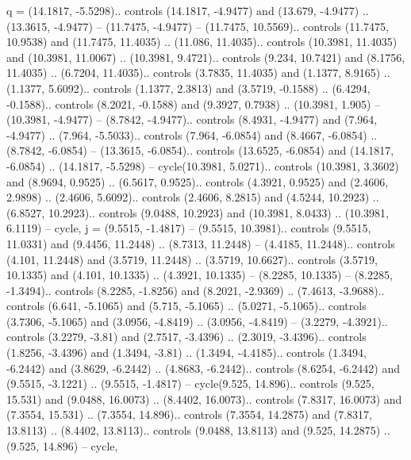 q = {(14.1817, -5.5298).. controls (14.1817, -4.9477) and (13.679, -4.9477) .. (13.3615, -4.9477) -- (11.7475, -4.9477) -- (11.7475, 10.5569).. controls (11.7475, 10.9538) and (11.7475, 11.4035) .. (11.086, 11.4035).. controls (10.3981, 11.4035) and (10.3981, 11.0067) .. (10.3981, 9.4721).. controls (9.234, 10.7421) and (8.1756, 11.4035) .. (6.7204, 11.4035).. controls (3.7835, 11.4035) and (1.1377, 8.9165) .. (1.1377, 5.6092).. controls (1.1377, 2.3813) and (3.5719, -0.1588) .. (6.4294, -0.1588).. controls (8.2021, -0.1588) and (9.3927, 0.7938) .. (10.3981, 1.905) -- (10.3981, -4.9477) -- (8.7842, -4.9477).. controls (8.4931, -4.9477) and (7.964, -4.9477) .. (7.964, -5.5033).. controls (7.964, -6.0854) and (8.4667, -6.0854) .. (8.7842, -6.0854) -- (13.3615, -6.0854).. controls (13.6525, -6.0854) and (14.1817, -6.0854) .. (14.1817, -5.5298) -- cycle(10.3981, 5.0271).. controls (10.3981, 3.3602) and (8.9694, 0.9525) .. (6.5617, 0.9525).. controls (4.3921, 0.9525) and (2.4606, 2.9898) .. (2.4606, 5.6092).. controls (2.4606, 8.2815) and (4.5244, 10.2923) .. (6.8527, 10.2923).. controls (9.0488, 10.2923) and (10.3981, 8.0433) .. (10.3981, 6.1119) -- cycle},
j = {(9.5515, -1.4817) -- (9.5515, 10.3981).. controls (9.5515, 11.0331) and (9.4456, 11.2448) .. (8.7313, 11.2448) -- (4.4185, 11.2448).. controls (4.101, 11.2448) and (3.5719, 11.2448) .. (3.5719, 10.6627).. controls (3.5719, 10.1335) and (4.101, 10.1335) .. (4.3921, 10.1335) -- (8.2285, 10.1335) -- (8.2285, -1.3494).. controls (8.2285, -1.8256) and (8.2021, -2.9369) .. (7.4613, -3.9688).. controls (6.641, -5.1065) and (5.715, -5.1065) .. (5.0271, -5.1065).. controls (3.7306, -5.1065) and (3.0956, -4.8419) .. (3.0956, -4.8419) -- (3.2279, -4.3921).. controls (3.2279, -3.81) and (2.7517, -3.4396) .. (2.3019, -3.4396).. controls (1.8256, -3.4396) and (1.3494, -3.81) .. (1.3494, -4.4185).. controls (1.3494, -6.2442) and (3.8629, -6.2442) .. (4.8683, -6.2442).. controls (8.6254, -6.2442) and (9.5515, -3.1221) .. (9.5515, -1.4817) -- cycle(9.525, 14.896).. controls (9.525, 15.531) and (9.0488, 16.0073) .. (8.4402, 16.0073).. controls (7.8317, 16.0073) and (7.3554, 15.531) .. (7.3554, 14.896).. controls (7.3554, 14.2875) and (7.8317, 13.8113) .. (8.4402, 13.8113).. controls (9.0488, 13.8113) and (9.525, 14.2875) .. (9.525, 14.896) -- cycle},
